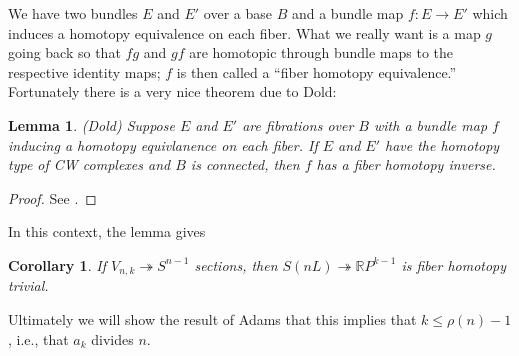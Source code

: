 \documentclass{article}
\newcommand{\R}{\mathbb{R}}
\newcommand{\RP}{\R P}
\newcommand{\onto}{\twoheadrightarrow}
\newtheorem{cor}[thm]{Corollary}
\newtheorem{lem}[thm]{Lemma}
\begin{document}
We have two bundles $E$ and $E'$ over a base $B$ and a bundle map $f: E \to E'$ which induces a homotopy equivalence on each fiber.  What we really want is a map $g$ going back so that $fg$ and $gf$ are homotopic through bundle maps to the respective identity maps;  $f$ is then called a ``fiber homotopy equivalence.''  Fortunately there is a very nice theorem due to Dold:
\begin{lem}(Dold)
Suppose $E$ and $E'$ are fibrations over $B$ with a bundle map $f$ inducing a homotopy equivlanence on each fiber.  If $E$ and $E'$ have the homotopy type of CW complexes and $B$ is connected, then $f$ has a fiber homotopy inverse.
\end{lem}
\begin{proof}
See \cite{James}.
\end{proof}
In this context, the lemma gives
\begin{cor}
If $V_{n, k} \onto S^{n-1}$ sections, then $S(nL) \onto \RP^{k-1}$ is fiber homotopy trivial.
\end{cor}
Ultimately we will show the result of Adams that this implies that $k \le \rho(n) - 1$, i.e., that $a_k$ divides $n$.
\end{document}
